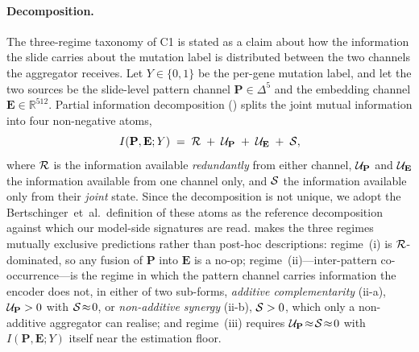 \paragraph{Decomposition.}
The three-regime taxonomy of C1 is stated as a claim about how the
information the slide carries about the mutation label is
distributed between the two channels the aggregator receives.
Let $Y\in\{0,1\}$ be the per-gene mutation label, and let the two
sources be the slide-level pattern channel $\mathbf{P}\in\Delta^{5}$
and the \ctranspath{} embedding channel
$\mathbf{E}\in\mathbb{R}^{512}$.
Partial information decomposition
(\pid{})\cite{williams2010pid,bertschinger2014unique} splits the
joint mutual information\cite{cover2006elements} into four
non-negative atoms,
\begin{equation}
I\!\left(\mathbf{P},\mathbf{E};Y\right) \;=\;
\mathcal{R} \;+\; \mathcal{U}_{\mathbf{P}} \;+\; \mathcal{U}_{\mathbf{E}} \;+\; \mathcal{S} ,
\label{eq:pid}
\end{equation}
where $\mathcal{R}$ is the information available \emph{redundantly} from
either channel, $\mathcal{U}_{\mathbf{P}}$ and $\mathcal{U}_{\mathbf{E}}$ the
information available from one channel only, and $\mathcal{S}$ the
information available only from their \emph{joint} state.
Since the decomposition is not unique, we adopt the
Bertschinger~et~al.\ definition of these atoms\cite{bertschinger2014unique}
as the reference decomposition against which our model-side signatures are
read.
 makes the three regimes mutually exclusive
predictions rather than post-hoc descriptions: regime~(i) is
$\mathcal{R}$-dominated, so any fusion of $\mathbf{P}$ into $\mathbf{E}$
is a no-op; regime~(ii)---inter-pattern co-occurrence---is the
regime in which the pattern channel carries information the encoder
does not, in either of two sub-forms, \emph{additive
complementarity} (ii-a), $\mathcal{U}_{\mathbf{P}}>0$ with
$\mathcal{S}\!\approx\!0$, or \emph{non-additive synergy}
(ii-b), $\mathcal{S}>0$, which only a non-additive aggregator can realise;
and regime~(iii) requires
$\mathcal{U}_{\mathbf{P}}\!\approx\!\mathcal{S}\!\approx\!0$ with
$I(\mathbf{P},\mathbf{E};Y)$ itself near the estimation floor.

